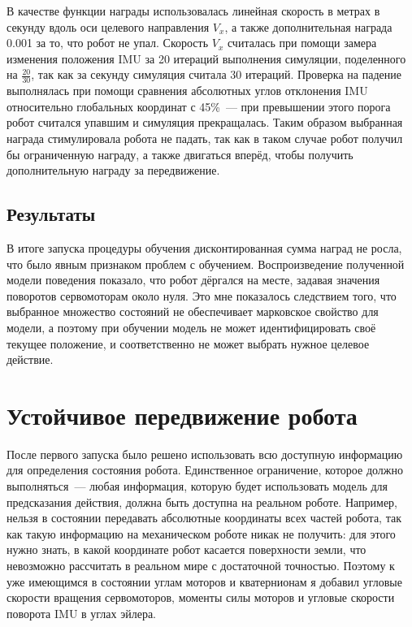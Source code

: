 В качестве функции награды использовалась линейная скорость в метрах в секунду вдоль оси целевого направления $V_x$, а также дополнительная награда 0.001 за то, что робот не упал. Скорость $V_x$ считалась при помощи замера изменения положения IMU за 20 итераций выполнения симуляции, поделенного на $\frac{20}{30}$, так как за секунду симуляция считала 30 итераций. Проверка на падение выполнялась при помощи сравнения абсолютных углов отклонения IMU относительно глобальных координат с 45\%~--- при превышении этого порога робот считался упавшим и симуляция прекращалась. Таким образом выбранная награда стимулировала робота не падать, так как в таком случае робот получил бы ограниченную награду, а также двигаться вперёд, чтобы получить дополнительную награду за передвижение. 


\subsection{Результаты}\label{sec:ch1.2/sec5}
В итоге запуска процедуры обучения дисконтированная сумма наград не росла, что было явным признаком проблем с обучением. Воспроизведение полученной модели поведения показало, что робот дёргался на месте, задавая значения поворотов сервомоторам около нуля. Это мне показалось следствием того, что выбранное множество состояний не обеспечивает марковское свойство для модели, а поэтому при обучении модель не может идентифицировать своё текущее положение, и соответственно не может выбрать нужное целевое действие.

\section{Устойчивое передвижение робота}\label{sec:ch2/sec5}
После первого запуска было решено использовать всю доступную информацию для определения состояния робота. Единственное ограничение, которое должно выполняться~--- любая информация, которую будет использовать модель для предсказания действия, должна быть доступна на реальном роботе. Например, нельзя в состоянии передавать абсолютные координаты всех частей робота, так как такую информацию на механическом роботе никак не получить: для этого нужно знать, в какой координате робот касается поверхности земли, что невозможно рассчитать в реальном мире с достаточной точностью. Поэтому к уже имеющимся в состоянии углам моторов и кватернионам я добавил угловые скорости вращения сервомоторов, моменты силы моторов и угловые скорости поворота IMU в углах эйлера.

